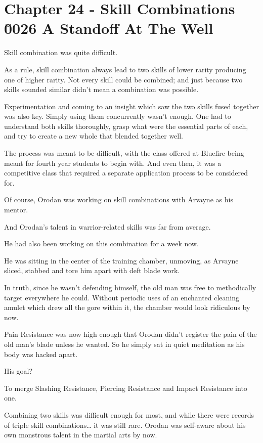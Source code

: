 \documentclass[a4paper,10pt]{book}
\begin{document}
\section*{Chapter 24 - Skill Combinations \u0026 A Standoff At The Well}
%
\par
Skill combination was quite difficult.\par
As a rule, skill combination always lead to two skills of lower rarity producing one of higher rarity. Not every skill could be combined; and just because two skills sounded similar didn’t mean a combination was possible.\par
Experimentation and coming to an insight which saw the two skills fused together was also key. Simply using them concurrently wasn’t enough. One had to understand both skills thoroughly, grasp what were the essential parts of each, and try to create a new whole that blended together well.\par
The process was meant to be difficult, with the class offered at Bluefire being meant for fourth year students to begin with. And even then, it was a competitive class that required a separate application process to be considered for.\par
Of course, Orodan was working on skill combinations with Arvayne as his mentor.\par
And Orodan’s talent in warrior-related skills was far from average.\par
He had also been working on this combination for a week now.\par
He was sitting in the center of the training chamber, unmoving, as Arvayne sliced, stabbed and tore him apart with deft blade work.\par
In truth, since he wasn’t defending himself, the old man was free to methodically target everywhere he could. Without periodic uses of an enchanted cleaning amulet which drew all the gore within it, the chamber would look ridiculous by now.\par
Pain Resistance was now high enough that Orodan didn’t register the pain of the old man’s blade unless he wanted. So he simply sat in quiet meditation as his body was hacked apart.\par
His goal?\par
To merge Slashing Resistance, Piercing Resistance and Impact Resistance into one.\par
Combining two skills was difficult enough for most, and while there were records of triple skill combinations… it was still rare. Orodan was self-aware about his own monstrous talent in the martial arts by now.\par
\end{document}
